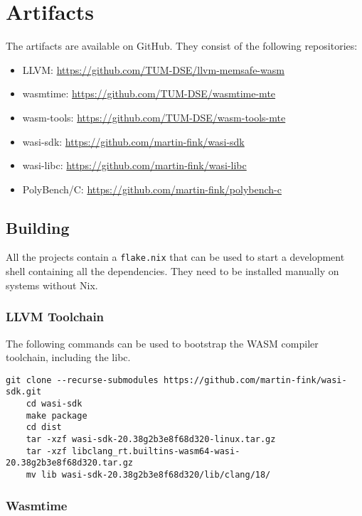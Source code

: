 \chapter{Artifacts}
\label{ch:artifacts}

The artifacts are available on GitHub.
They consist of the following repositories:

\begin{itemize}
    \item LLVM: \url{https://github.com/TUM-DSE/llvm-memsafe-wasm}
    \item wasmtime: \url{https://github.com/TUM-DSE/wasmtime-mte}
    \item wasm-tools: \url{https://github.com/TUM-DSE/wasm-tools-mte}
    \item wasi-sdk: \url{https://github.com/martin-fink/wasi-sdk}
    \item wasi-libc: \url{https://github.com/martin-fink/wasi-libc}
    \item PolyBench/C: \url{https://github.com/martin-fink/polybench-c}
\end{itemize}


\section{Building}
\label{sec:building}

All the projects contain a \texttt{flake.nix} that can be used to start a development shell containing all the dependencies.
They need to be installed manually on systems without Nix.

\subsection{LLVM Toolchain}
\label{subsec:llvm-toolchain}

The following commands can be used to bootstrap the \ac{WASM} compiler toolchain, including the libc.

\begin{lstlisting}[label={lst:building-sdk}]
    git clone --recurse-submodules https://github.com/martin-fink/wasi-sdk.git
    cd wasi-sdk
    make package
    cd dist
    tar -xzf wasi-sdk-20.38g2b3e8f68d320-linux.tar.gz
    tar -xzf libclang_rt.builtins-wasm64-wasi-20.38g2b3e8f68d320.tar.gz
    mv lib wasi-sdk-20.38g2b3e8f68d320/lib/clang/18/
\end{lstlisting}

\subsection{Wasmtime}
\label{subsec:building-wasmtime}

